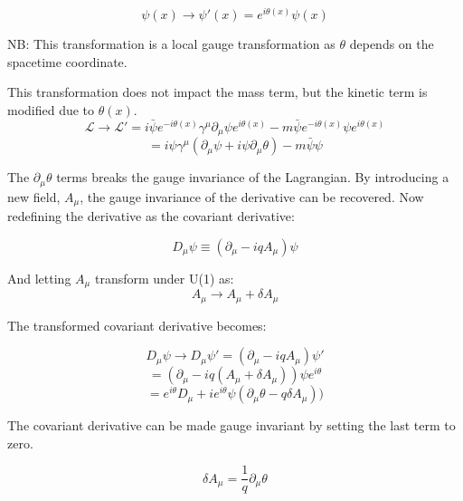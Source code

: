 \begin{equation}
\psi(x) \rightarrow \psi'(x) = e^{i\theta(x)}\psi(x)
\end{equation}

NB: This transformation is a local gauge transformation as $\theta$ depends on the spacetime coordinate.

This transformation does not impact the mass term, but the kinetic term is modified due to $\theta(x)$.
\begin{equation}
\mathcal{L} \rightarrow \mathcal{L}' = i\bar{\psi} e^{-i\theta(x)}\gamma^{\mu}\partial_{\mu}\psi e^{i\theta(x)} - m \bar{\psi}e^{-i\theta(x)}\psi e^{i\theta(x)}
\end{equation}
\begin{equation}
= i\psi \gamma^{\mu}(\partial_{ \mu }\psi + i \psi \partial_{ \mu } \theta)- m \bar{ \psi } \psi
\end{equation}

The $\partial_{\mu}\theta$ terms breaks the gauge invariance of the Lagrangian. By introducing a new field, $A_{\mu}$, the gauge invariance of the derivative can be recovered. Now redefining the derivative as the covariant derivative:

\begin{equation}
D_{\mu}\psi \equiv (\partial_{\mu} - iqA_{\mu})\psi
\end{equation}

And letting $A_{\mu}$ transform under U(1) as:
\begin{equation}
A_{\mu} \rightarrow A_{\mu} +  \delta A_{\mu} 
\end{equation}

The transformed covariant derivative becomes:

\begin{equation}
D_{\mu}\psi \rightarrow D_{\mu}\psi' =  (\partial_{\mu} - iq A_{\mu})\psi'
\end{equation}
\begin{equation}
=  (\partial_{\mu} - iq(A_{\mu} +  \delta A_{\mu} ))\psi e^{i\theta}
\end{equation}
\begin{equation}
=  e^{i\theta}D_{\mu}+ie^{i\theta}\psi(\partial_{\mu}\theta - q\delta A_{\mu}))
 \end{equation}


The covariant derivative can be made gauge invariant by setting the last term to zero.

\begin{equation}
\delta A_{\mu} = \frac{1}{q}\partial_{\mu}\theta
\end{equation}

